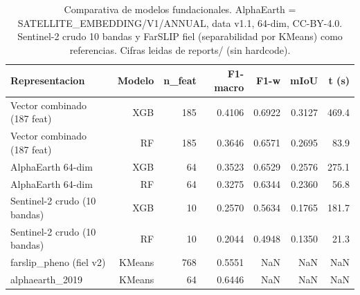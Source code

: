 \begin{table}
\caption{Comparativa de modelos fundacionales. AlphaEarth = SATELLITE\_EMBEDDING/V1/ANNUAL, data v1.1, 64-dim, CC-BY-4.0. Sentinel-2 crudo 10 bandas y FarSLIP fiel (separabilidad por KMeans) como referencias. Cifras leidas de reports/ (sin hardcode).}
\label{tab:fm_comparison}
\begin{tabular}{lrrrrrr}
\toprule
Representacion & Modelo & n\_feat & F1-macro & F1-w & mIoU & t (s) \\
\midrule
Vector combinado (187 feat) & XGB & 185 & 0.4106 & 0.6922 & 0.3127 & 469.4 \\
Vector combinado (187 feat) & RF & 185 & 0.3646 & 0.6571 & 0.2695 & 83.9 \\
AlphaEarth 64-dim & XGB & 64 & 0.3523 & 0.6529 & 0.2576 & 275.1 \\
AlphaEarth 64-dim & RF & 64 & 0.3275 & 0.6344 & 0.2360 & 56.8 \\
Sentinel-2 crudo (10 bandas) & XGB & 10 & 0.2570 & 0.5634 & 0.1765 & 181.7 \\
Sentinel-2 crudo (10 bandas) & RF & 10 & 0.2044 & 0.4948 & 0.1350 & 21.3 \\
farslip\_pheno (fiel v2) & KMeans & 768 & 0.5551 & NaN & NaN & NaN \\
alphaearth\_2019 & KMeans & 64 & 0.6446 & NaN & NaN & NaN \\
\bottomrule
\end{tabular}
\end{table}
